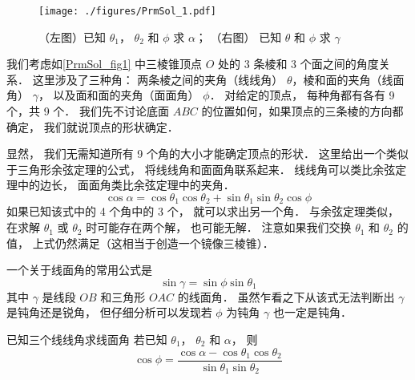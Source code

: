


\begin{figure}[ht]
\centering
\texttt{[image: ./figures/PrmSol\_1.pdf]}
\caption{（左图）已知 $\theta_1$， $\theta_2$ 和 $\phi$ 求 $\alpha$； （右图） 已知 $\theta$ 和 $\phi$ 求 $\gamma$} \label{PrmSol_fig1}
\end{figure}

我们考虑如\autoref{PrmSol_fig1} 中三棱锥顶点 $O$ 处的 3 条棱和 3 个面之间的角度关系． 这里涉及了三种角： 两条棱之间的夹角（线线角） $\theta$，棱和面的夹角（线面角） $\gamma$， 以及面和面的夹角（面面角） $\phi$． 对给定的顶点， 每种角都有各有 9 个，共 9 个． 我们先不讨论底面 $ABC$ 的位置如何，如果顶点的三条棱的方向都确定， 我们就说顶点的形状确定．

显然， 我们无需知道所有 9 个角的大小才能确定顶点的形状． 这里给出一个类似于三角形余弦定理的公式， 将线线角和面面角联系起来． 线线角可以类比余弦定理中的边长， 面面角类比余弦定理中的夹角．
\begin{equation}\label{PrmSol_eq1}
\cos\alpha = \cos\theta_1 \cos\theta_2 + \sin\theta_1 \sin\theta_2 \cos\phi
\end{equation}
如果已知该式中的 4 个角中的 3 个， 就可以求出另一个角． 与余弦定理类似， 在求解 $\theta_1$ 或 $\theta_2$ 时可能存在两个解， 也可能无解． 注意如果我们交换 $\theta_1$ 和 $\theta_2$ 的值， 上式仍然满足（这相当于创造一个镜像三棱锥）．

一个关于线面角的常用公式是
\begin{equation}\label{PrmSol_eq2}
\sin\gamma = \sin\phi\sin\theta_1
\end{equation}
其中 $\gamma$ 是线段 $OB$ 和三角形 $OAC$ 的线面角． 虽然乍看之下从该式无法判断出 $\gamma$ 是钝角还是锐角， 但仔细分析可以发现若 $\phi$ 为钝角 $\gamma$ 也一定是钝角．

\begin{example}{已知三个线线角求线面角}
若已知 $\theta_1$， $\theta_2$ 和 $\alpha$， 则
\begin{equation}
\cos\phi = \frac{\cos\alpha - \cos\theta_1 \cos\theta_2}{\sin\theta_1 \sin\theta_2}
\end{equation}
\end{example}

